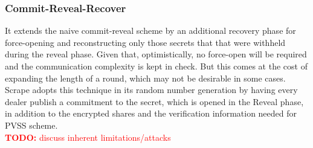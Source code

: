 \documentclass[letterpaper,twocolumn,10pt]{article}
\theoremstyle{definition}
\theoremstyle{remark}
\newcommand{\todo}[1]{\textcolor{red}{\textbf{TODO:} #1}}
\begin{document}
\subsubsection{Commit-Reveal-Recover}
It extends the naive commit-reveal scheme by an additional recovery phase for
force-opening and reconstructing only those secrets that that were withheld during the reveal phase. Given that, optimistically, no force-open will be required and the communication complexity is kept in check. But this comes at the cost of expanding the length of a round, which may not be desirable in some cases. Scrape adopts this technique in its random number generation by having every dealer publish a commitment to the secret, which is opened in the Reveal phase, in addition to the encrypted shares and the verification information needed for PVSS scheme.\\

\todo{discuss inherent limitations/attacks}
\end{document}
